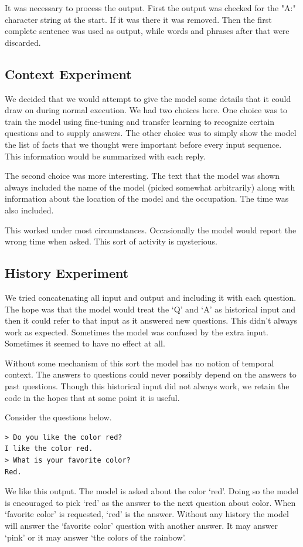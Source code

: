 It was necessary to process the output. First the output was checked for the "A:" character string at the start. If it was there it was removed. Then the first complete sentence was used as output, while words and phrases after that were discarded.

\subsection{Context Experiment}
We decided that we would attempt to give the model some details that it could draw on during normal execution. We had two choices here. One choice was to train the model using fine-tuning and transfer learning to recognize certain questions and to supply answers. The other choice was to simply show the model the list of facts that we thought were important before every input sequence. This information would be summarized with each reply.

The second choice was more interesting. The text that the model was shown always included the name of the model (picked somewhat arbitrarily) along with information about the location of the model and the occupation. The time was also included.

This worked under most circumstances. Occasionally the model would report the wrong time when asked. This sort of activity is mysterious.

\subsection{History Experiment}
We tried concatenating all input and output and including it with each question. The hope was that the model would treat the `Q' and `A' as historical input and then it could refer to that input as it answered new questions. This didn't always work as expected. Sometimes the model was confused by the extra input. Sometimes it seemed to have no effect at all.

Without some mechanism of this sort the model has no notion of temporal context. The answers to questions could never possibly depend on the answers to past questions. Though this historical input did not always work, we retain the code in the hopes that at some point it is useful.

Consider the questions below.
\begin{verbatim}
> Do you like the color red?
I like the color red.
> What is your favorite color?
Red.
\end{verbatim}
We like this output. The model is asked about the color `red'. Doing so the model is encouraged to pick `red' as the answer to the next question about color. When `favorite color' is requested, `red' is the answer. Without any history the model will answer the `favorite color' question with another answer. It may answer `pink' or it may answer `the colors of the rainbow'. 


